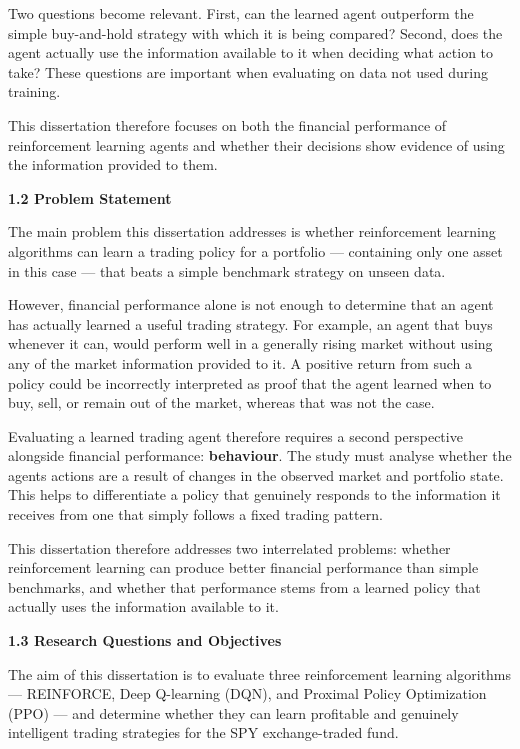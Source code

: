 Two questions become relevant. First, can the learned agent outperform
the simple buy-and-hold strategy with which it is being compared?
Second, does the agent actually use the information available to it when
deciding what action to take? These questions are important when
evaluating on data not used during training.

This dissertation therefore focuses on both the financial performance of
reinforcement learning agents and whether their decisions show evidence
of using the information provided to them.

\textbf{1.2 Problem Statement}

The main problem this dissertation addresses is whether reinforcement
learning algorithms can learn a trading policy for a portfolio ---
containing only one asset in this case --- that beats a simple benchmark
strategy on unseen data.

However, financial performance alone is not enough to determine that an
agent has actually learned a useful trading strategy. For example, an
agent that buys whenever it can, would perform well in a generally
rising market without using any of the market information provided to
it. A positive return from such a policy could be incorrectly
interpreted as proof that the agent learned when to buy, sell, or remain
out of the market, whereas that was not the case.

Evaluating a learned trading agent therefore requires a second
perspective alongside financial performance: \textbf{behaviour}. The
study must analyse whether the agent\textquotesingle s actions are a
result of changes in the observed market and portfolio state. This helps
to differentiate a policy that genuinely responds to the information it
receives from one that simply follows a fixed trading pattern.

This dissertation therefore addresses two interrelated problems: whether
reinforcement learning can produce better financial performance than
simple benchmarks, and whether that performance stems from a learned
policy that actually uses the information available to it.

\textbf{1.3 Research Questions and Objectives}

The aim of this dissertation is to evaluate three reinforcement learning
algorithms --- REINFORCE, Deep Q-learning (DQN), and Proximal Policy
Optimization (PPO) --- and determine whether they can learn profitable
and genuinely intelligent trading strategies for the SPY exchange-traded
fund.

